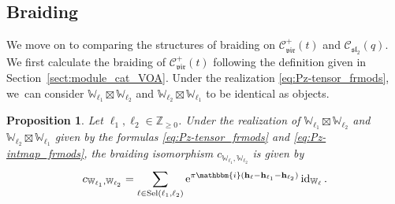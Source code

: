 \documentclass[pdftex]{sigma}
\numberwithin{equation}{section}
\newtheorem{prop}[thm]{Proposition}
 { \theoremstyle{definition}
\newtheorem{defn}[thm]{Definition}
\newtheorem{Note}[thm]{Note}
\newtheorem{exam}[thm]{Example}
\newtheorem{rem}[thm]{Remark} }
\newcommand{\id}{\operatorname{id}}
\newcommand{\bZ}{\mathbb{Z}}
\newcommand{\cC}{\mathcal{C}}
\newcommand{\fsl}{\mathfrak{sl}}
\newcommand{\bbmi}{\mathbbm{i}}
\newcommand{\catQG}{\cC_{\fsl_{2}}}
\newcommand{\catVir}{\cC_{\vir}}
\newcommand{\Sel}{\mathrm{Sel}}
\newcommand{\virmod}{\mathbb{W}}
\newcommand{\vir}{\mathfrak{vir}}
\newcommand{\frweight}[1]{\mathbf{h}_{#1}}
\begin{document}
\subsection{Braiding}
We move on to comparing the structures of braiding on $\catVir^{+}(t)$ and $\catQG(q)$.
We first calculate the braiding of $\catVir^{+}(t)$ following the definition given in Section~\ref{sect:module_cat_VOA}.
Under the realization \eqref{eq:Pz-tensor_frmods}, we~can consider $\virmod_{\ell_{1}}\boxtimes \virmod_{\ell_{2}}$ and $\virmod_{\ell_{2}}\boxtimes\virmod_{\ell_{1}}$ to be identical as objects.
\begin{prop}
\label{prop:braiding_first_row}
Let $\ell_{1},\ell_{2}\in \bZ_{\geq 0}$.
Under the realization of $\virmod_{\ell_{1}}\boxtimes \virmod_{\ell_{2}}$ and $\virmod_{\ell_{2}}\boxtimes\virmod_{\ell_{1}}$ given by the formulas \eqref{eq:Pz-tensor_frmods} and \eqref{eq:Pz-intmap_frmods}, the braiding isomorphism $c_{\virmod_{\ell_{1}},\virmod_{\ell_{2}}}$ is given by
\begin{gather*}
 c_{\virmod_{\ell_{1}},\virmod_{\ell_{2}}}=\sum_{\ell\in \Sel (\ell_{1},\ell_{2})}{\rm e}^{\pi\bbmi (\frweight{\ell}-\frweight{\ell_{1}}-\frweight{\ell_{2}})}\id_{\virmod_{\ell}}.
\end{gather*}
\end{prop}
\end{document}
